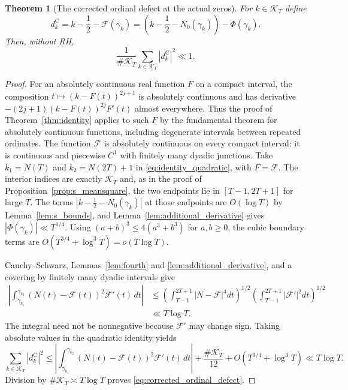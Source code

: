 \documentclass[11pt,a4paper]{article}
\makeatletter
\numberwithin{equation}{section}
\DeclareRobustCommand{\CGref}[1]{\ref{#1}}
\DeclareRobustCommand{\CGeqref}[1]{\eqref{#1}}
\let\CG@origref\ref
\let\CG@origeqref\eqref
\newcommand{\CG@gettip}[1]{\@ifundefined{CGTip@#1}{#1}{\csname CGTip@#1\endcsname}}
\DeclareRobustCommand{\CGref}[1]{\pdftooltip{\CG@origref{#1}}{\CG@gettip{#1}}}
\DeclareRobustCommand{\CGeqref}[1]{\pdftooltip{\CG@origeqref{#1}}{\CG@gettip{#1}}}
\newtheorem{theorem}{Theorem}[section]
\theoremstyle{definition}
\theoremstyle{remark}
\newcommand{\Nz}{N_0} %
\newcommand{\Fc}{\mathcal F}
\newcommand{\Ph}{\Phi}
\makeatother
\begin{document}
\begin{theorem}[The corrected ordinal defect at the actual zeros]\label{thm:corrected_ordinal_defect}
For $k\in\mathcal K_T$ define
\[
 d_k^{\mathrm C}=k-\frac12-\Fc(\gamma_k)
 =\left(k-\frac12-\Nz(\gamma_k)\right)-\Ph(\gamma_k).
\]
Then, without RH,
\begin{equation}
\frac1{\#\mathcal K_T}\sum_{k\in\mathcal K_T}
|d_k^{\mathrm C}|^2\ll1.
\label{eq:corrected_ordinal_defect}
\end{equation}
\end{theorem}
\begin{proof}
For an absolutely continuous real function $F$ on a compact interval,
the composition $t\mapsto(k-F(t))^{2j+1}$ is absolutely continuous
and has derivative $-(2j+1)(k-F(t))^{2j}F'(t)$ almost everywhere.
Thus the proof of Theorem~\CGref{thm:identity} applies to such $F$
by the fundamental theorem for absolutely continuous functions,
including degenerate intervals between repeated ordinates.
The function $\Fc$ is absolutely continuous on every compact interval:
it is continuous and piecewise $C^1$ with finitely many dyadic junctions.
Take $k_1=N(T)$ and $k_2=N(2T)+1$ in
\CGeqref{eq:identity_quadratic}, with $F=\Fc$. The interior indices are
exactly $\mathcal K_T$ and, as in the proof of
Proposition~\CGref{prop:s_meansquare}, the two endpoints lie in
$[T-1,2T+1]$ for large $T$. The terms
$|k-\frac12-\Nz(\gamma_k)|$ at those endpoints are $O(\log T)$ by
Lemma~\CGref{lem:s_bounds}, and Lemma~\CGref{lem:additional_derivative}
gives $|\Ph(\gamma_k)|\ll T^{1/4}$.
Using $(a+b)^3\le4(a^3+b^3)$ for $a,b\ge0$, the cubic boundary terms are $O(T^{3/4}+\log^3T)=o(T\log T)$.

Cauchy--Schwarz, Lemmas~\CGref{lem:fourth} and
\CGref{lem:additional_derivative}, and a covering by finitely many dyadic
intervals give
\[
\begin{aligned}
\left|\int_{\gamma_{k_1}}^{\gamma_{k_2}}
(N(t)-\Fc(t))^2\Fc'(t)\,dt\right|
&\le\left(\int_{T-1}^{2T+1}|N-\Fc|^4dt\right)^{1/2}
\left(\int_{T-1}^{2T+1}|\Fc'|^2dt\right)^{1/2}\\
&\ll T\log T.
\end{aligned}
\]
The integral need not be nonnegative because $\Fc'$ may change sign.
Taking absolute values in the quadratic identity yields
\[
\sum_{k\in\mathcal K_T}|d_k^{\mathrm C}|^2
\le\left|\int_{\gamma_{k_1}}^{\gamma_{k_2}}
(N(t)-\Fc(t))^2\Fc'(t)\,dt\right|
+\frac{\#\mathcal K_T}{12}+O(T^{3/4}+\log^3T)
\ll T\log T.
\]
Division by $\#\mathcal K_T\asymp T\log T$ proves
\CGeqref{eq:corrected_ordinal_defect}.
\end{proof}
\end{document}

